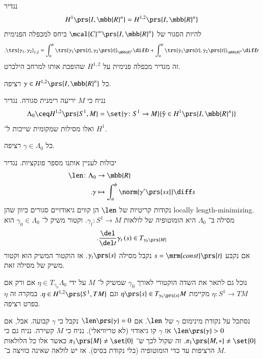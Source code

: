 \documentclass[a4paper,10pt,twoside,openany]{book}
\begin{document}
\begin{definition}
נגדיר
\[H^1 \prs{I,\mbb{R}^n} = H^{1,2}\prs{I, \mbb{R}^n}\]
להיות הסגור של
$\mcal{C}^\infty \prs{I,\mbb{R}^n}$
ביחס למכפלה הפנימית
\[\text{.} \trs{\gamma_1, \gamma_2}_{1,2} = \int_a^b \trs{\gamma_1\prs{t}, \gamma_2\prs{t}}_{\mbb{R}^n} \diff t + \int_a^b \trs{\dot{\gamma}_1\prs{t}, \dot{\gamma}_2\prs{t}}_{\mbb{R}^n} \diff t\]
זה מגדיר מכפלה פנימית על
$H^{1,2}$
שהופכת אותו למרחב הילברט.
\end{definition}

\begin{theorem}
כל
$\gamma \in H^{1,2} \prs{I, \mbb{R}^n}$
רציפה.
\end{theorem}




נניח כי
$M$
יריעה רימנית סגורה.
נגדיר
\[\Lambda_0 \ceq H^{1,2}\prs{S^1, M} = \set{\gamma \colon S^1 \to M}{\hat{\gamma} \in H^1\prs{I, \mbb{R}^n}}\]
ואלו מסילות שמקומית שייכות ל־%
$H^1$.

\begin{fact}
כל
$\gamma \in \Lambda_0$
רציפה.
\end{fact}

יכולות לעניין אותנו מספר פונקציות.
נגדיר
\begin{align*}
\len \colon \Lambda_0 &\to \mbb{R} \\
\text{.} \gamma &\mapsto \int_a^b \norm{\gamma'\prs{ss}} \diff s
\end{align*}
נקודות קריטיות של
$\len$
הן קווים גיאודזיים סגורים כיוון שהן
\textenglish{locally length-minimizing}.
מסילה ב־%
$\Lambda_0$
היא הומוטופיה של לולאות
$\gamma_t \colon S^1 \to M$.
וקטור משיק ל־%
$\gamma_0 \in \Lambda_0$
הוא
\[\text{.} \frac{\del}{\del t} \gamma_t \left( s \right) \in T_{\gamma_0\prs{M}}\]
אם נקבע
$s = \mrm{const}\prs{t}$
נקבל מסילה
$\gamma_t\prs{s}$.
אז הוקטור המשיק הוא וקטור משיק של מסילה זאת.

נוכל גם לתאר את השדה הוקטורי לאורך
$\gamma_0$
שמשיק ל־%
$M$
על ידי
$\eta \in T_{\gamma_0}\Lambda_0$
אם ורק אם
$\eta \colon S^1 \to TM$
מקיימת
$\eta\prs{s} \in T_{\gamma_0\prs{s}}M$
וגם
$\eta \in H^{1,2}\prs{S^1, TM}$.
במקרה זה
$\eta$
בפרט רציפה.

נסתכל על נקודת מינימום
$\gamma$
של
$\len$.
אם
$\len\prs{\gamma} = 0$
נקבל כי
$\gamma$
קבועה. אבל, אם
$\len\prs{\gamma} > 0$
אז
$\gamma$
קו גיאודזי (לא טריוויאלי).
נניח כי
$M$
קשירה. נניח גם כי
$\pi_1\prs{M, *} \neq \set{0}$.
זה שקול לכך ש־%
$\pi_1\prs{M} \neq \set{0}$
כאשר אלו כל הלולאות הרציפות עד כדי הומוטופיה (בלי נקודת בסיס).
אז יש לולאה שאינה כוויצה ב־%
$M$.
\end{document}
